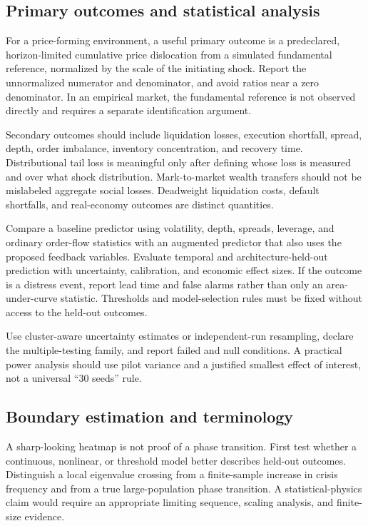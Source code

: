 \documentclass[11pt,a4paper]{article}
\theoremstyle{definition}
\theoremstyle{remark}
\begin{document}
\subsection{Primary outcomes and statistical analysis}
For a price-forming environment, a useful primary outcome is a predeclared, horizon-limited cumulative price dislocation from a simulated fundamental reference, normalized by the scale of the initiating shock. Report the unnormalized numerator and denominator, and avoid ratios near a zero denominator. In an empirical market, the fundamental reference is not observed directly and requires a separate identification argument.

Secondary outcomes should include liquidation losses, execution shortfall, spread, depth, order imbalance, inventory concentration, and recovery time. Distributional tail loss is meaningful only after defining whose loss is measured and over what shock distribution. Mark-to-market wealth transfers should not be mislabeled aggregate social losses. Deadweight liquidation costs, default shortfalls, and real-economy outcomes are distinct quantities.

Compare a baseline predictor using volatility, depth, spreads, leverage, and ordinary order-flow statistics with an augmented predictor that also uses the proposed feedback variables. Evaluate temporal and architecture-held-out prediction with uncertainty, calibration, and economic effect sizes. If the outcome is a distress event, report lead time and false alarms rather than only an area-under-curve statistic. Thresholds and model-selection rules must be fixed without access to the held-out outcomes.

Use cluster-aware uncertainty estimates or independent-run resampling, declare the multiple-testing family, and report failed and null conditions. A practical power analysis should use pilot variance and a justified smallest effect of interest, not a universal ``30 seeds'' rule.

\subsection{Boundary estimation and terminology}
A sharp-looking heatmap is not proof of a phase transition. First test whether a continuous, nonlinear, or threshold model better describes held-out outcomes. Distinguish a local eigenvalue crossing from a finite-sample increase in crisis frequency and from a true large-population phase transition. A statistical-physics claim would require an appropriate limiting sequence, scaling analysis, and finite-size evidence.
\end{document}
